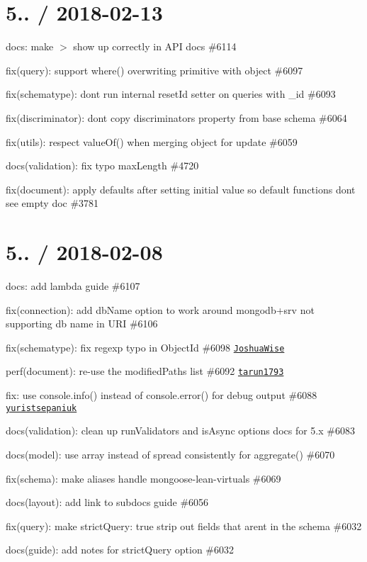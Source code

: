 \section*{5.. / 2018-\/02-\/13 }


\begin{DoxyItemize}
\item docs\+: make $>$ show up correctly in A\+PI docs \#6114
\item fix(query)\+: support {\ttfamily where()} overwriting primitive with object \#6097
\item fix(schematype)\+: don\textquotesingle{}t run internal {\ttfamily reset\+Id} setter on queries with \+\_\+id \#6093
\item fix(discriminator)\+: don\textquotesingle{}t copy {\ttfamily discriminators} property from base schema \#6064
\item fix(utils)\+: respect {\ttfamily value\+Of()} when merging object for update \#6059
\item docs(validation)\+: fix typo \textquotesingle{}max\+Length\textquotesingle{} \#4720
\item fix(document)\+: apply defaults after setting initial value so default functions don\textquotesingle{}t see empty doc \#3781
\end{DoxyItemize}

\section*{5.. / 2018-\/02-\/08 }


\begin{DoxyItemize}
\item docs\+: add lambda guide \#6107
\item fix(connection)\+: add {\ttfamily db\+Name} option to work around {\ttfamily mongodb+srv} not supporting db name in U\+RI \#6106
\item fix(schematype)\+: fix regexp typo in Object\+Id \#6098 \href{https://github.com/JoshuaWise}{\tt Joshua\+Wise}
\item perf(document)\+: re-\/use the modified\+Paths list \#6092 \href{https://github.com/tarun1793}{\tt tarun1793}
\item fix\+: use console.\+info() instead of console.\+error() for debug output \#6088 \href{https://github.com/yuristsepaniuk}{\tt yuristsepaniuk}
\item docs(validation)\+: clean up run\+Validators and is\+Async options docs for 5.\+x \#6083
\item docs(model)\+: use array instead of spread consistently for aggregate() \#6070
\item fix(schema)\+: make aliases handle mongoose-\/lean-\/virtuals \#6069
\item docs(layout)\+: add link to subdocs guide \#6056
\item fix(query)\+: make strict\+Query\+: true strip out fields that aren\textquotesingle{}t in the schema \#6032
\item docs(guide)\+: add notes for {\ttfamily strict\+Query} option \#6032
\end{DoxyItemize}


